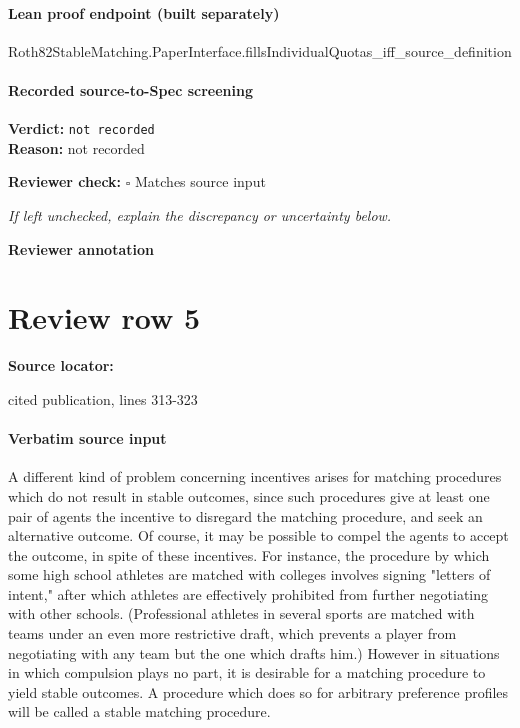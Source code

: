 \documentclass[10pt]{article}
\newcommand{\reviewerbox}{%
  \par\noindent\fbox{\parbox{0.96\linewidth}{\rule{0pt}{0.38in}}}\par
}
\newcommand{\reviewmatch}[1]{%
  \par\noindent\textbf{Reviewer check:} $\square$\; #1\par
  \noindent\emph{If left unchecked, explain the discrepancy or uncertainty below.}\par
}
\begin{document}
\paragraph{Lean proof endpoint (built separately)}\begin{ReviewVerbatim}
Roth82StableMatching.PaperInterface.fillsIndividualQuotas_iff_source_definition
\end{ReviewVerbatim}

\paragraph{Recorded source-to-Spec screening}
\textbf{Verdict:} \texttt{not recorded}
\\
\textbf{Reason:} not recorded
\reviewmatch{Matches source input}
\noindent\textbf{Reviewer annotation}\par
\reviewerbox
\clearpage
\hypertarget{source-claim-a59d544dcd58d682}{}
\section*{Review row 5}
\textbf{Source locator:} {\footnotesize\raggedright cited publication, lines 313-\allowbreak{}323\par}
\paragraph{Verbatim source input}
\begin{ReviewVerbatim}
A different kind of problem concerning incentives arises for matching procedures
which do not result in stable outcomes, since such procedures give at least one pair of
agents the incentive to disregard the matching procedure, and seek an alternative
outcome. Of course, it may be possible to compel the agents to accept the outcome, in
spite of these incentives. For instance, the procedure by which some high school
athletes are matched with colleges involves signing "letters of intent," after which
athletes are effectively prohibited from further negotiating with other schools. (Professional athletes in several sports are matched with teams under an even more restrictive
draft, which prevents a player from negotiating with any team but the one which drafts
him.) However in situations in which compulsion plays no part, it is desirable for a
matching procedure to yield stable outcomes. A procedure which does so for arbitrary
preference profiles will be called a stable matching procedure.
\end{ReviewVerbatim}
\end{document}
